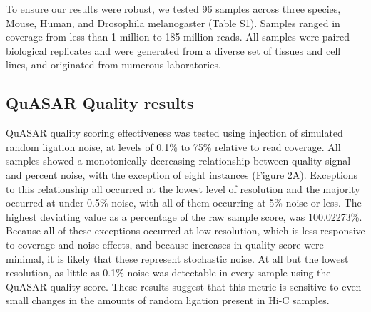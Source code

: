 To ensure our results were robust, we tested 96 samples across three species, Mouse, Human, and Drosophila melanogaster (Table S1). Samples ranged in coverage from less than 1 million to 185 million reads. All samples were paired biological replicates and were generated from a diverse set of tissues and cell lines, and originated from numerous laboratories. 

\subsection{QuASAR Quality results}

QuASAR quality scoring effectiveness was tested using injection of simulated random ligation noise, at levels of 0.1\% to 75\% relative to read coverage. All samples showed a monotonically decreasing relationship between quality signal and percent noise, with the exception of eight instances (Figure 2A). Exceptions to this relationship all occurred at the lowest level of resolution and the majority occurred at under 0.5\% noise, with all of them occurring at 5\% noise or less. The highest deviating value as a percentage of the raw sample score, was 100.02273\%. Because all of these exceptions occurred at low resolution, which is less responsive to coverage and noise effects, and because increases in quality score were minimal, it is likely that these represent stochastic noise. At all but the lowest resolution, as little as 0.1\% noise was detectable in every sample using the QuASAR quality score. These results suggest that this metric is sensitive to even small changes in the amounts of random ligation present in Hi-C samples.


